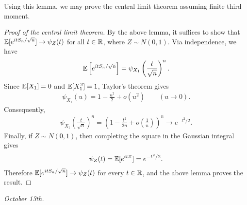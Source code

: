 Using this lemma, we may prove the central limit theorem assuming finite third moment.

\begin{proof}[Proof of the central limit theorem]
    By the above lemma, it suffices to show that $\mathbb{E}[e^{it S_{n}/\sqrt{n}}] \to \psi_{Z}(t)$ for all $t \in \mathbb{R}$, where $Z \sim N(0,1)$. Via independence, we have
    \begin{align}
        \mathbb{E}\left[ e^{it S_{n}/\sqrt{n}} \right] = \psi_{X_{1}} \left( \frac{t}{\sqrt{n}} \right)^{n}.
    \end{align}
    Since $\mathbb{E}[X_{1}]=0$ and $\mathbb{E}[X_{1}^{2}]=1$, Taylor's theorem gives
    \begin{align}
        \psi_{X_{1}}(u)=1-\frac{u^{2}}{2}+o(u^{2}) \qquad (u\to 0).
    \end{align}
    Consequently,
    \begin{align}
        \psi_{X_{1}}\left(\frac{t}{\sqrt{n}}\right)^{n}
        =\left(1-\frac{t^{2}}{2n}+o\left(\frac{1}{n}\right)\right)^{n}
        \to e^{-t^{2}/2}.
    \end{align}
    Finally, if $Z\sim N(0,1)$, then completing the square in the Gaussian integral gives
    \begin{align}
        \psi_{Z}(t)=\mathbb{E}[e^{itZ}]=e^{-t^{2}/2}.
    \end{align}
    Therefore $\mathbb{E}[e^{itS_{n}/\sqrt{n}}]\to\psi_{Z}(t)$ for every $t\in\mathbb{R}$, and the above lemma proves the result.
\end{proof}

\noindent \textit{October 13th.}

